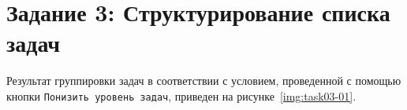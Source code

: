 \section{Задание 3: Структурирование списка задач}

Результат группировки задач в соответствии с условием, проведенной с помощью
кнопки \texttt{Понизить уровень задач}, приведен на рисунке~\ref{img:task03-01}.

